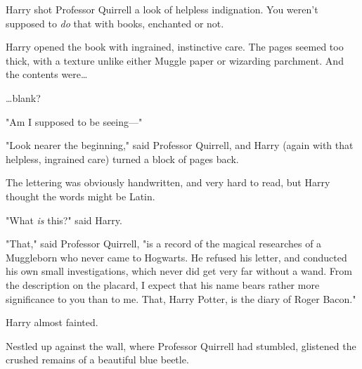 Harry shot Professor Quirrell a look of helpless indignation. You weren't 
supposed to \emph{do} that with books, enchanted or not.

Harry opened the book with ingrained, instinctive care. The pages seemed too 
thick, with a texture unlike either Muggle paper or wizarding parchment. And 
the contents were{\ldots}

{\ldots}blank?

"Am I supposed to be seeing---"

"Look nearer the beginning," said Professor Quirrell, and Harry (again with 
that helpless, ingrained care) turned a block of pages back.

The lettering was obviously handwritten, and very hard to read, but Harry 
thought the words might be Latin.

"What \emph{is} this?" said Harry.

"That," said Professor Quirrell, "is a record of the magical researches of a 
Muggleborn who never came to Hogwarts. He refused his letter, and conducted his 
own small investigations, which never did get very far without a wand. From the 
description on the placard, I expect that his name bears rather more 
significance to you than to me. That, Harry Potter, is the diary of Roger 
Bacon."

Harry almost fainted.

Nestled up against the wall, where Professor Quirrell had stumbled, glistened 
the crushed remains of a beautiful blue beetle.

